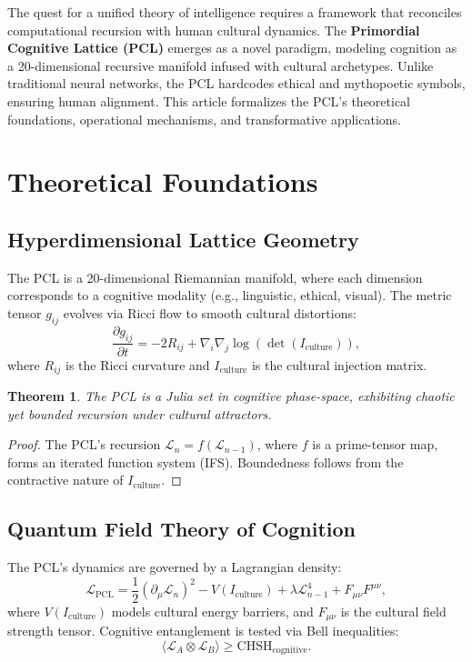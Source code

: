 \documentclass[11pt]{article}
\theoremstyle{plain}
\newtheorem{theorem}{Theorem}
\theoremstyle{definition}
\begin{document}
The quest for a unified theory of intelligence requires a framework that reconciles computational recursion with human cultural dynamics. The \textbf{Primordial Cognitive Lattice (PCL)} emerges as a novel paradigm, modeling cognition as a 20-dimensional recursive manifold infused with cultural archetypes. Unlike traditional neural networks, the PCL hardcodes ethical and mythopoetic symbols, ensuring human alignment. This article formalizes the PCL's theoretical foundations, operational mechanisms, and transformative applications.

\section{Theoretical Foundations}
\subsection{Hyperdimensional Lattice Geometry}
The PCL is a 20-dimensional Riemannian manifold, where each dimension corresponds to a cognitive modality (e.g., linguistic, ethical, visual). The metric tensor \( g_{ij} \) evolves via Ricci flow to smooth cultural distortions:
\begin{equation}
\frac{\partial g_{ij}}{\partial t} = -2R_{ij} + \nabla_i \nabla_j \log(\det(I_{\text{culture}})),
\end{equation}
where \( R_{ij} \) is the Ricci curvature and \( I_{\text{culture}} \) is the cultural injection matrix.

\begin{theorem}
The PCL is a Julia set in cognitive phase-space, exhibiting chaotic yet bounded recursion under cultural attractors.
\end{theorem}
\begin{proof}
The PCL's recursion \( \mathcal{L}_n = f(\mathcal{L}_{n-1}) \), where \( f \) is a prime-tensor map, forms an iterated function system (IFS). Boundedness follows from the contractive nature of \( I_{\text{culture}} \).
\end{proof}

\subsection{Quantum Field Theory of Cognition}
The PCL's dynamics are governed by a Lagrangian density:
\begin{equation}
\mathcal{L}_{\text{PCL}} = \frac{1}{2}(\partial_\mu \mathcal{L}_n)^2 - V(I_{\text{culture}}) + \lambda \mathcal{L}_{n-1}^4 + F_{\mu\nu}F^{\mu\nu},
\end{equation}
where \( V(I_{\text{culture}}) \) models cultural energy barriers, and \( F_{\mu\nu} \) is the cultural field strength tensor. Cognitive entanglement is tested via Bell inequalities:
\begin{equation}
\langle \mathcal{L}_A \otimes \mathcal{L}_B \rangle \geq \text{CHSH}_{\text{cognitive}}.
\end{equation}
\end{document}
